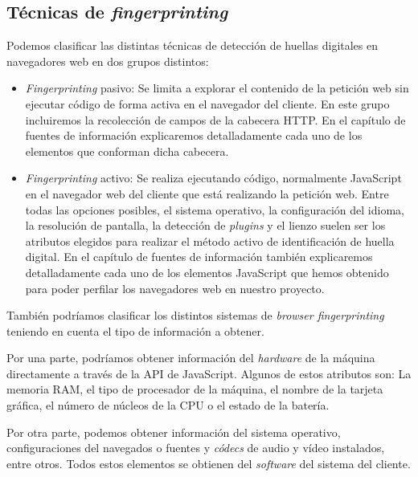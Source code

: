 \subsection{Técnicas de \textit{fingerprinting}}

Podemos clasificar las distintas técnicas de detección de huellas digitales en navegadores web en dos grupos distintos:

\begin{itemize}
	\item \textit{Fingerprinting} pasivo: Se limita a explorar el contenido de la petición web sin ejecutar código de forma activa en el navegador del cliente. En este grupo incluiremos la recolección de campos de la cabecera HTTP. En el capítulo de fuentes de información explicaremos detalladamente cada uno de los elementos que conforman dicha cabecera.
	
	\item \textit{Fingerprinting} activo:  Se realiza ejecutando código, normalmente JavaScript en el navegador web del cliente que está realizando la petición web. Entre todas las opciones posibles, el sistema operativo, la configuración del idioma, la resolución de pantalla, la detección de \textit{plugins} y el lienzo suelen ser los atributos elegidos para realizar el método activo de identificación de huella digital. En el capítulo de fuentes de información también explicaremos detalladamente cada uno de los elementos JavaScript que hemos obtenido para poder perfilar los navegadores web en nuestro proyecto.
	
\end{itemize}

También podríamos clasificar los distintos sistemas de \textit{browser fingerprinting} teniendo en cuenta el tipo de información a obtener. \par 

Por una parte, podríamos obtener información del \textit{hardware} de la máquina directamente a través de la API de JavaScript. Algunos de estos atributos son: La memoria RAM, el tipo de procesador de la máquina, el nombre de la tarjeta gráfica, el número de núcleos de la CPU o el estado de la batería. \par

Por otra parte, podemos obtener información del sistema operativo, configuraciones del navegados o fuentes y \textit{códecs} de audio y vídeo instalados, entre otros. Todos estos elementos se obtienen del \textit{software} del sistema del cliente. \par 

